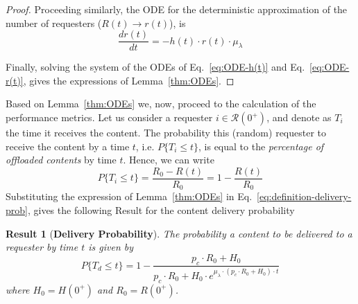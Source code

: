 \documentclass[10pt,conference,letterpaper]{IEEEtran}
\newtheorem{result}{Result}
\newcommand{\eq}[1]{Eq.~\eqref{#1}}
\begin{document}
\begin{proof}
Proceeding similarly, the ODE for the deterministic approximation of the number of requesters ($R(t)\rightarrow r(t)$), is 
\begin{equation}\label{eq:ODE-r(t)}
 \frac{dr(t)}{dt} = -h(t)\cdot r(t)\cdot \mu_{\lambda}
\end{equation}

Finally, solving the system of the ODEs of \eq{eq:ODE-h(t)} and \eq{eq:ODE-r(t)}, gives the expressions of Lemma~\ref{thm:ODEs}.
\end{proof}

Based on Lemma~\ref{thm:ODEs} we, now, proceed to the calculation of the performance metrics. Let us consider a requester $i\in\mathcal{R}(0^{+})$, and denote as $T_{i}$ the time it receives the content. The probability this (random) requester to receive the content by a time $t$, i.e. $P\{T_{i}\leq t\}$, is equal to the \textit{percentage of offloaded contents} by time $t$. Hence, we can write
\begin{equation}\label{eq:definition-delivery-prob}
 P\{T_{i}\leq t\} = \frac{R_{0}-R(t)}{R_{0}} = 1-\frac{R(t)}{R_{0}}
\end{equation}
Substituting the expression of Lemma~\ref{thm:ODEs} in \eq{eq:definition-delivery-prob}, gives the following Result for the content delivery probability


\begin{result}[\textbf{Delivery Probability}]\label{result:delivery-probability-single}
The probability a content to be delivered to a requester by time $t$ is given by
\begin{equation*}
 P\{T_{d}\leq t\} =  1-\frac{p_{c}\cdot R_{0}+H_{0}}{p_{c}\cdot R_{0}+H_{0}\cdot e^{\mu_{\lambda}\cdot (p_{c}\cdot R_{0}+H_{0}) \cdot t}}
\end{equation*}
where $H_{0} = H(0^{+})$ and $R_{0} = R(0^{+})$.
\end{result}
\end{document}
